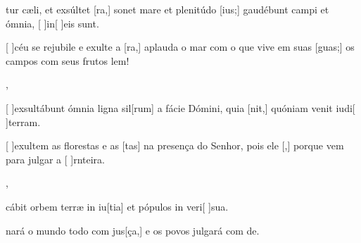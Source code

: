 {  {\item {}tur cæli, et exsúltet [ra,] sonet mare et plenitúdo [ius;] gaudébunt campi et ómnia, [ ]{in}[ ]{e}is sunt.~\Antiphona}%
    {\item {}[ ]{céu} se rejubile e exulte a [ra,] aplauda o mar com o que vive em suas [guas;]  os campos com seus frutos lem!~\Antiphona},
  {\item {}[ ]{ex}sultábunt ómnia ligna sil[rum] a fácie Dómini, quia [nit,] quóniam venit iudi[ ]{ter}ram.~\Antiphona}%
    {\item {}[ ]{e}xultem as florestas e as [tas] na presença do Senhor, pois ele [,] porque vem para julgar a [ ]{rn}{tei}ra.~\Antiphona},
  {\item {}cábit orbem terræ in iu[tia] et pópulos in veri[ ]{su}a.~\Antiphona}%
    {\item {}nará o mundo todo com jus[ça,] e os povos julgará com de.~\Antiphona}
}